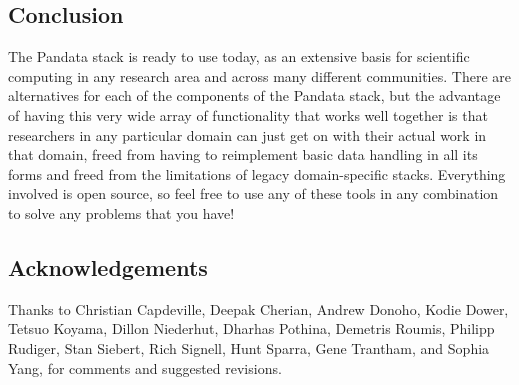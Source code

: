 \subsection{Conclusion}

The Pandata stack is ready to use today, as an extensive basis for scientific computing in any research area and across many different communities. There are alternatives for each of the components of the Pandata stack, but the advantage of having this very wide array of functionality that works well together is that researchers in any particular domain can just get on with their actual work in that domain, freed from having to reimplement basic data handling in all its forms and freed from the limitations of legacy domain-specific stacks. Everything involved is open source, so feel free to use any of these tools in any combination to solve any problems that you have!

\subsection{Acknowledgements}

Thanks to Christian Capdeville, Deepak Cherian, Andrew Donoho, Kodie Dower, Tetsuo Koyama, Dillon Niederhut, Dharhas Pothina, Demetris Roumis, Philipp Rudiger, Stan Siebert, Rich Signell, Hunt Sparra, Gene Trantham, and Sophia Yang, for comments and suggested revisions.

